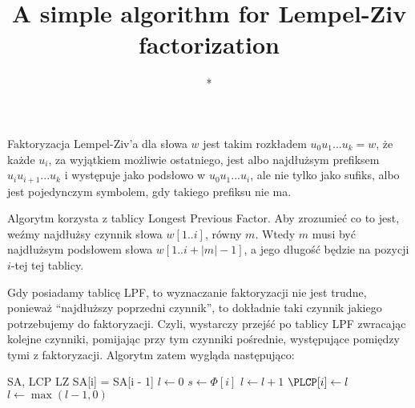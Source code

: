 \documentclass[a4paper,12pt]{article}
\title{A simple algorithm for Lempel-Ziv factorization}
\author{*}
\begin{document}
\maketitle

Faktoryzacja Lempel-Ziv'a dla słowa $w$ jest takim rozkładem $u_0 u_1 ... u_k = w$,
że każde $u_i$, za wyjątkiem możliwie ostatniego,
jest albo najdłużsym prefiksem $u_i u_{i + 1} ... u_k$ i występuje jako podsłowo w $u_0 u_1 ... u_i$,
ale nie tylko jako sufiks,
albo jest pojedynczym symbolem, gdy takiego prefiksu nie ma.

Algorytm korzysta z tablicy Longest Previous Factor.
Aby zrozumieć co to jest, weźmy najdłużsy czynnik słowa $w[1..i]$, równy $m$.
Wtedy $m$ musi być najdłużsym podsłowem słowa $w[1..i + |m| - 1]$,
a jego długość będzie na pozycji $i$-tej tej tablicy.

Gdy posiadamy tablicę LPF, to wyznaczanie faktoryzacji nie jest trudne,
ponieważ ``najdłuższy poprzedni czynnik'', to dokładnie taki czynnik jakiego potrzebujemy do faktoryzacji.
Czyli, wystarczy przejść po tablicy LPF zwracając kolejne czynniki,
pomijając przy tym czynniki pośrednie, występujące pomiędzy tymi z faktoryzacji.
Algorytm zatem wygląda następująco:

\begin{algorithmic} 
\REQUIRE SA, LCP
\ENSURE LZ
\STATE SA[i] = SA[i - 1]
\ENDFOR
\STATE $l \gets 0$
\STATE $s \gets \Phi[i]$
\STATE $l \gets l + 1$
\ENDWHILE
\STATE $\PLCP[i] \gets l$
\STATE $l \gets \max(l - 1, 0)$
\ENDFOR
\end{algorithmic}
\end{document}
